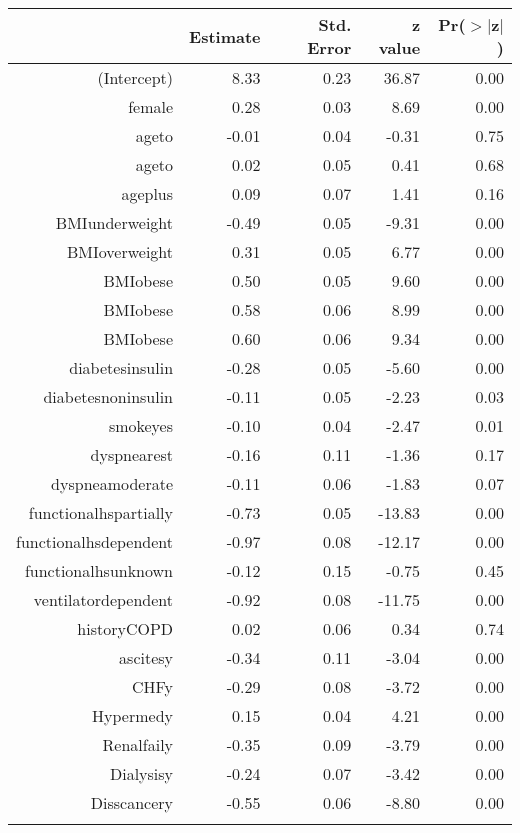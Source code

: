 \bigskip\bigskip
\centering
\begin{tabular}{rrrrr}
  \hline
 & Estimate & Std. Error & z value & Pr($>$$|$z$|$) \\ 
  \hline
(Intercept) & 8.33 & 0.23 & 36.87 & 0.00 \\ 
  female & 0.28 & 0.03 & 8.69 & 0.00 \\ 
  age\-65\-to\-74 & -0.01 & 0.04 & -0.31 & 0.75 \\ 
  age\-75\-to\-84 & 0.02 & 0.05 & 0.41 & 0.68 \\ 
  age\-85\-plus & 0.09 & 0.07 & 1.41 & 0.16 \\ 
  BMI\-underweight & -0.49 & 0.05 & -9.31 & 0.00 \\ 
  BMI\-overweight & 0.31 & 0.05 & 6.77 & 0.00 \\ 
  BMI\-obese\-1 & 0.50 & 0.05 & 9.60 & 0.00 \\ 
  BMI\-obese\-2 & 0.58 & 0.06 & 8.99 & 0.00 \\ 
  BMI\-obese\-3 & 0.60 & 0.06 & 9.34 & 0.00 \\ 
  diabetes\-insulin & -0.28 & 0.05 & -5.60 & 0.00 \\ 
  diabetes\-noninsulin & -0.11 & 0.05 & -2.23 & 0.03 \\ 
  smoke\-yes & -0.10 & 0.04 & -2.47 & 0.01 \\ 
  dyspnea\-rest & -0.16 & 0.11 & -1.36 & 0.17 \\ 
  dyspnea\-moderate & -0.11 & 0.06 & -1.83 & 0.07 \\ 
  functional\-hs\-partially & -0.73 & 0.05 & -13.83 & 0.00 \\ 
  functional\-hs\-dependent & -0.97 & 0.08 & -12.17 & 0.00 \\ 
  functional\-hs\-unknown & -0.12 & 0.15 & -0.75 & 0.45 \\ 
  ventilator\-dependent & -0.92 & 0.08 & -11.75 & 0.00 \\ 
  history\-COPD & 0.02 & 0.06 & 0.34 & 0.74 \\ 
  ascites\-y & -0.34 & 0.11 & -3.04 & 0.00 \\ 
  CHF\-y & -0.29 & 0.08 & -3.72 & 0.00 \\ 
  Hyper\-med\-y & 0.15 & 0.04 & 4.21 & 0.00 \\ 
  Renal\-fail\-y & -0.35 & 0.09 & -3.79 & 0.00 \\ 
  Dialysis\-y & -0.24 & 0.07 & -3.42 & 0.00 \\ 
  Diss\-cancer\-y & -0.55 & 0.06 & -8.80 & 0.00 \\ 
$$
\end{tabular}
